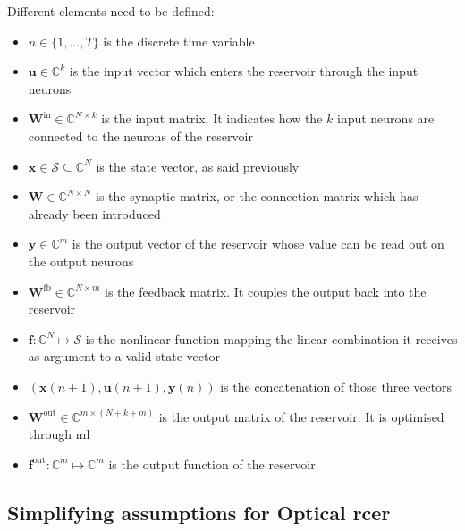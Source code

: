 Different elements need to be defined: 

\begin{itemize}
	\item $n \in \{1, \dots, T\}$ is the discrete time variable
	\item $\mathbf{u} \in \mathbb{C}^k$ is the input vector which enters the reservoir through the input neurons
	\item $\mathbf{W}^{\text{in}} \in \mathbb{C}^{N \times k}$ is the input matrix. It indicates how the $k$ input neurons are connected to the neurons of the reservoir
	\item $\mathbf{x} \in \mathcal{S} \subseteq \mathbb{C}^{N}$ is the state vector, as said previously
	\item $\mathbf{W} \in \mathbb{C}^{N \times N}$ is the synaptic matrix, or the connection matrix which has already been introduced
	\item $\mathbf{y} \in \mathbb{C}^{m}$ is the output vector of the reservoir whose value can be read out on the output neurons
	\item $\mathbf{W}^{\text{fb}} \in \mathbb{C}^{N \times m}$ is the feedback matrix. It couples the output back into the reservoir
	\item $\mathbf{f}: \mathbb{C}^N \mapsto \mathcal{S}$ is the nonlinear function mapping the linear combination it receives as argument to a valid state vector
	\item $\left(\mathbf{x}(n+1), \mathbf{u}(n+1), \mathbf{y}(n)\right)$ is the concatenation of those three vectors
	\item $\mathbf{W}^{\text{out}} \in \mathbb{C}^{m \times (N+k+m)}$ is the output matrix of the reservoir. It is optimised through \gls{ml}
	\item $\mathbf{f}^{\text{out}} : \mathbb{C}^{m} \mapsto \mathbb{C}^{m}$ is the output function of the reservoir
\end{itemize}

\subsection{Simplifying assumptions for Optical \acrshort{rcer}}

